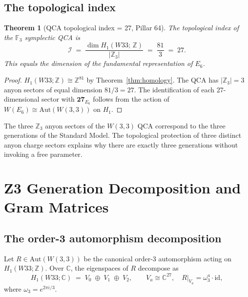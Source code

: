 \documentclass[11pt,a4paper]{article}
\newtheorem{theorem}{Theorem}[section]
\theoremstyle{definition}
\theoremstyle{remark}
\newcommand{\GF}[1]{\mathbb{F}_{#1}}
\newcommand{\ZZ}{\mathbb{Z}}
\newcommand{\CC}{\mathbb{C}}
\newcommand{\Aut}{\mathrm{Aut}}
\begin{document}
\subsection{The topological index}

\begin{theorem}[QCA topological index = 27, Pillar 64]\label{thm:qca_index}
The topological index of the $\GF{3}$ symplectic QCA is
\[
    \mathcal{I} \;=\; \frac{\dim H_1(W33;\,\ZZ)}{|\ZZ_3|} \;=\; \frac{81}{3} \;=\; 27.
\]
This equals the dimension of the fundamental representation of $E_6$.
\end{theorem}

\begin{proof}[Proof]
$H_1(W33;\ZZ) \cong \ZZ^{81}$ by Theorem~\ref{thm:homology}.  The QCA has $|\ZZ_3|=3$
anyon sectors of equal dimension $81/3 = 27$.  The identification of each
27-dimensional sector with $\mathbf{27}_{E_6}$ follows from the action of
$W(E_6) \cong \Aut(W(3{,}3))$ on $H_1$.
\end{proof}

\begin{keyresult}
The three $\ZZ_3$ anyon sectors of the $W(3{,}3)$ QCA correspond to the three
generations of the Standard Model.  The topological protection of three distinct
anyon charge sectors explains why there are exactly three generations without
invoking a free parameter.
\end{keyresult}

\section{Z3 Generation Decomposition and Gram Matrices}\label{sec:sectors}

\subsection{The order-3 automorphism decomposition}

Let $R \in \Aut(W(3{,}3))$ be the canonical order-3 automorphism acting on
$H_1(W33;\ZZ)$.  Over $\CC$, the eigenspaces of $R$ decompose as
\[
    H_1(W33;\CC) \;=\; V_0 \;\oplus\; V_1 \;\oplus\; V_2,
    \qquad
    V_a \cong \CC^{27},
    \quad
    R|_{V_a} = \omega_3^a \cdot \mathrm{id},
\]
where $\omega_3 = e^{2\pi i/3}$.
\end{document}
